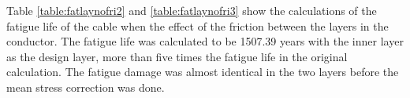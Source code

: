 Table \ref{table:fatlaynofri2} and \ref{table:fatlaynofri3} show the calculations of the fatigue life of the cable when the effect of the friction between the layers in the conductor. The fatigue life was calculated to be 1507.39 years with the inner layer as the design layer, more than five times the fatigue life in the original calculation. The fatigue damage was almost identical in the two layers before the mean stress correction was done. 





















